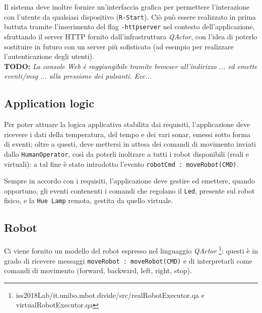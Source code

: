 \documentclass{../llncs}
\newcommand{\codescript}[1]{{\mbox{\small{\texttt{#1}}}}\xspace}
\newcommand{\code}[1]{{\color{blue}\small{\texttt{#1}}}}
\newcommand{\qa}{\textsf{\textit{QActor}}\xspace}
\newcommand{\todo}[1]{\textbf{TODO:} \emph{#1}}
\begin{document}


Il sistema deve inoltre fornire un'interfaccia grafica per permettere l'interazione con l'utente da qualsiasi dispositivo (\code{R-Start}). Ciò può essere realizzato in prima battuta tramite l'inserimento del flag \codescript{-httpserver} nel contesto dell'applicazione, sfruttando il server HTTP fornito dall'infrastruttura \qa, con l'idea di poterlo sostituire in futuro con un server più sofisticato (ad esempio per realizzare l'autenticazione degli utenti).\\



\todo{La console Web è raggiungibile tramite browser all'indirizzo ... ed emette eventi/msg ... alla pressione dei pulsanti. Ecc...}

\subsection{Application logic}
Per poter attuare la logica applicativa stabilita dai requisiti, l'applicazione deve ricevere i dati della temperatura, del tempo e dei vari sonar, emessi sotto forma di eventi; oltre a questi, deve mettersi in attesa dei comandi di movimento inviati dallo \texttt{HumanOperator}, così da poterli inoltrare a tutti i robot disponibili (reali e virtuali): a tal fine è stato introdotto l'evento \codescript{robotCmd : moveRobot(CMD)}.

Sempre in accordo con i requisiti, l'applicazione deve gestire ed emettere, quando opportuno, gli eventi contenenti i comandi che regolano il \texttt{Led}, presente sul robot fisico, e la \texttt{Hue Lamp} remota, gestita da quello virtuale.\\



\subsection{Robot}
Ci viene fornito un modello del robot espresso nel linguaggio \qa
\footnote{iss2018Lab/it.unibo.mbot.divide/src/realRobotExecutor.qa e virtualRobotExecutor.qa}: questi è in grado di ricevere messaggi \codescript{moveRobot : moveRobot(CMD)} e di interpretarli come comandi di movimento (forward, backward, left, right, stop).
\end{document}
